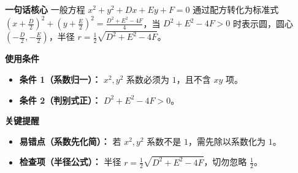 \begin{summarybox}
	\textbf{\textcolor{CSummary}{一句话核心}}
	一般方程 $x^2+y^2+Dx+Ey+F=0$ 通过配方转化为标准式 $(x+\frac{D}{2})^2+(y+\frac{E}{2})^2 = \frac{D^2+E^2-4F}{4}$，当 $D^2+E^2-4F>0$ 时表示圆，圆心 $(-\frac{D}{2},-\frac{E}{2})$，半径 $r=\frac12\sqrt{D^2+E^2-4F}$。

	\medskip
	\textbf{\textcolor{CSummary}{使用条件}}
	\begin{itemize}[leftmargin=*, itemsep=0.5em, topsep=0.4em]
		\item \textbf{条件 1（系数归一）：} $x^2,y^2$ 系数必须为 $1$，且不含 $xy$ 项。
		\item \textbf{条件 2（判别式正）：} $D^2+E^2-4F > 0$。
	\end{itemize}

	\medskip
	\textbf{\textcolor{CSummary}{关键提醒}}
	\begin{itemize}[leftmargin=*, itemsep=0.5em, topsep=0.4em]
		\item \textbf{易错点（系数先化简）：} 若 $x^2,y^2$ 系数不是 $1$，需先除以系数化为 $1$。
		\item \textbf{检查项（半径公式）：} 半径 $r=\frac12\sqrt{D^2+E^2-4F}$，切勿忽略 $\frac12$。
	\end{itemize}

\end{summarybox}
